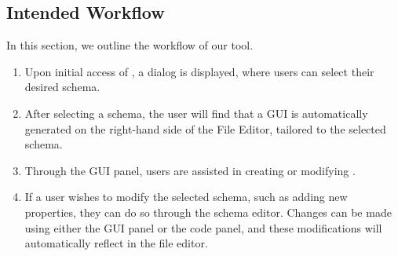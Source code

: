 \subsection{Intended Workflow}\label{subsec:workflow} %
In this section, we outline the workflow of our tool.

\begin{enumerate}
    \item Upon initial access of \toolname{}, a dialog is displayed, where users can select their desired schema.
    \item After selecting a schema, the user will find that a GUI is automatically generated on the right-hand side of the File Editor,
    tailored to the selected schema.
    \item Through the GUI panel, users are assisted in creating or modifying \cfgfiles{}.
    \item If a user wishes to modify the selected schema, such as adding new properties, they can do so through the schema editor.
    Changes can be made using either the GUI panel or the code panel, and these modifications will automatically reflect in the file editor.
\end{enumerate}

